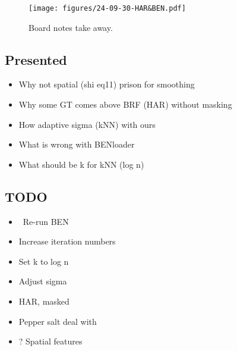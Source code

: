 
\begin{figure}[htbp]
    \centering
    \texttt{[image: figures/24-09-30-HAR\&BEN.pdf]}
    \caption{Board notes take away.}
    \label{fig:24-09-30-HAR&BEN}
\end{figure}

\begin{multicols}{2}
\subsection*{Presented}
\begin{itemize}
    \item Why not spatial (shi eq11) prison for smoothing 
    \item Why some GT comes above BRF (HAR) without masking
    \item How adaptive sigma (kNN) with ours
    \item What is wrong with BENloader
    \item What should be k for kNN (log n)
\end{itemize}

\subsection*{TODO}
\begin{itemize}
    \item \checkmark \ Re-run BEN
    \item Increase iteration numbers
    \item Set k to log n
    \item Adjust sigma
    \item HAR, masked
    \item Pepper salt deal with
    \item ? Spatial features 
\end{itemize}
\end{multicols}

\newpage



